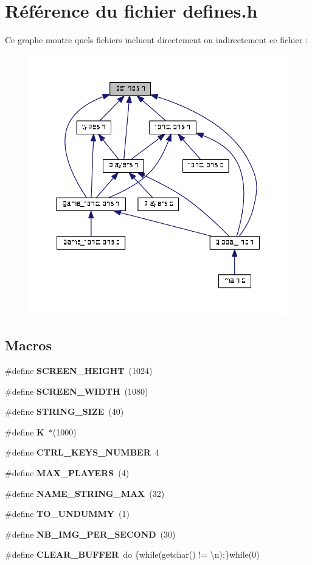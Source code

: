 \section{Référence du fichier defines.\+h}
\label{defines_8h}
Ce graphe montre quels fichiers incluent directement ou indirectement ce fichier \+:
\nopagebreak
\begin{figure}[H]
\begin{center}
\leavevmode
\includegraphics[width=350pt]{defines_8h__dep__incl}
\end{center}
\end{figure}
\subsection*{Macros}
\begin{DoxyCompactItemize}
\item 
\#define \textbf{ S\+C\+R\+E\+E\+N\+\_\+\+H\+E\+I\+G\+HT}~(1024)
\item 
\#define \textbf{ S\+C\+R\+E\+E\+N\+\_\+\+W\+I\+D\+TH}~(1080)
\item 
\#define \textbf{ S\+T\+R\+I\+N\+G\+\_\+\+S\+I\+ZE}~(40)
\item 
\#define \textbf{ K}~$\ast$(1000)
\item 
\#define \textbf{ C\+T\+R\+L\+\_\+\+K\+E\+Y\+S\+\_\+\+N\+U\+M\+B\+ER}~4
\item 
\#define \textbf{ M\+A\+X\+\_\+\+P\+L\+A\+Y\+E\+RS}~(4)
\item 
\#define \textbf{ N\+A\+M\+E\+\_\+\+S\+T\+R\+I\+N\+G\+\_\+\+M\+AX}~(32)
\item 
\#define \textbf{ T\+O\+\_\+\+U\+N\+D\+U\+M\+MY}~(1)
\item 
\#define \textbf{ N\+B\+\_\+\+I\+M\+G\+\_\+\+P\+E\+R\+\_\+\+S\+E\+C\+O\+ND}~(30)
\item 
\#define \textbf{ C\+L\+E\+A\+R\+\_\+\+B\+U\+F\+F\+ER}~do \{while(getchar() != \textquotesingle{}\textbackslash{}n\textquotesingle{});\}while(0)
\end{DoxyCompactItemize}


